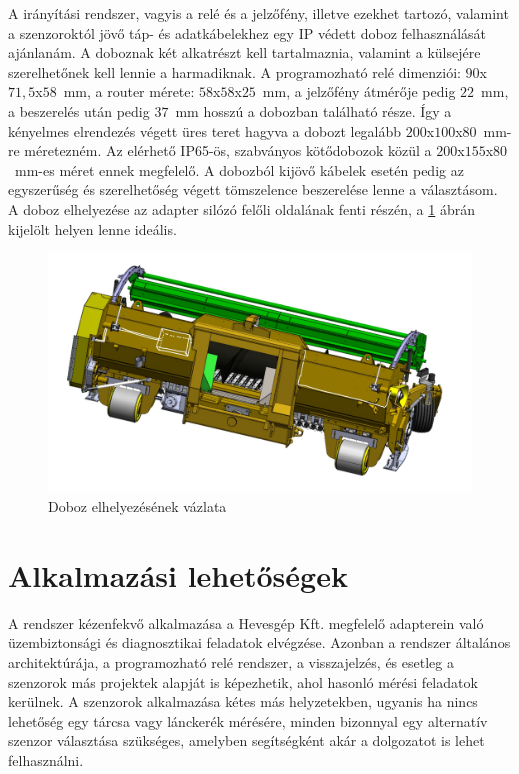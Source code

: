 A irányítási rendszer, vagyis a relé és a jelzőfény, illetve ezekhet tartozó, valamint a szenzoroktól jövő táp- és adatkábelekhez egy IP védett doboz felhasználását ajánlanám. A doboznak két alkatrészt kell tartalmaznia, valamint a külsejére szerelhetőnek kell lennie a harmadiknak. A programozható relé dimenziói: $90$x$71,5$x$58$~mm, a router mérete: $58$x$58$x$25$~mm, a jelzőfény átmérője pedig $22$~mm, a beszerelés után pedig $37$~mm hosszú a dobozban található része. Így a kényelmes elrendezés végett üres teret hagyva a dobozt legalább $200$x$100$x$80$~mm-re méretezném. Az elérhető IP65-ös, szabványos kötődobozok közül a $200$x$155$x$80$~mm-es méret ennek megfelelő. A dobozból kijövő kábelek esetén pedig az egyszerűség és szerelhetőség végett tömszelence beszerelése lenne a választásom. A doboz elhelyezése az adapter silózó felőli oldalának fenti részén, a \ref{doboz_elhelyezes} ábrán kijelölt helyen lenne ideális.
\begin{figure}
	\centering
	\includegraphics[width=\columnwidth*7/10]{figures/rajzolt_doboz.jpg}
	\caption{Doboz elhelyezésének vázlata}
	\label{doboz_elhelyezes}
\end{figure}

\section{Alkalmazási lehetőségek}

A rendszer kézenfekvő alkalmazása a Hevesgép Kft. megfelelő adapterein való üzembiztonsági és diagnosztikai feladatok elvégzése. Azonban a rendszer általános architektúrája, a programozható relé rendszer, a visszajelzés, és esetleg a szenzorok más projektek alapját is képezhetik, ahol hasonló mérési feladatok kerülnek. A szenzorok alkalmazása kétes más helyzetekben, ugyanis ha nincs lehetőség egy tárcsa vagy lánckerék mérésére, minden bizonnyal egy alternatív szenzor választása szükséges, amelyben segítségként akár a dolgozatot is lehet felhasználni.
